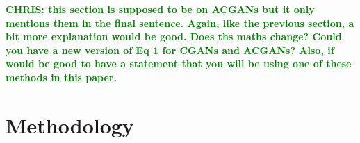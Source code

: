 \documentclass[12pt]{iopart}
\newcommand{\chris}[1]{\textbf{\textcolor{green}{CHRIS: #1}}}
\begin{document}
\chris{this section is supposed to be on ACGANs but it only mentions them in
the final sentence. Again, like the previous section, a bit more explanation
would be good. Does ths maths change? Could you have a new version of Eq 1 for
CGANs and ACGANs? Also, if would be good to have a statement that you will be
using one of these methods in this paper.}

\section{Methodology}

\end{document}
